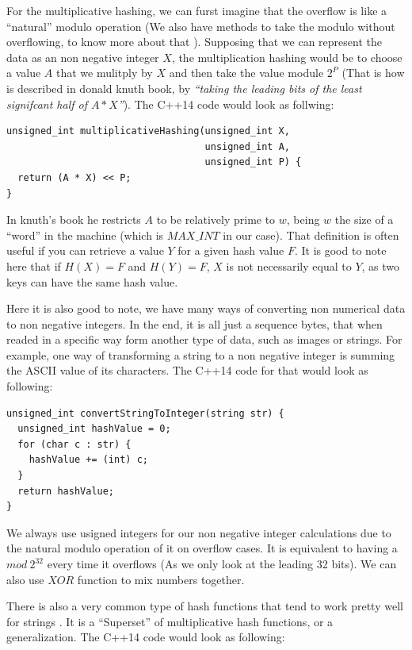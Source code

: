 For the multiplicative hashing, we can furst imagine that the overflow is like a ``natural'' modulo operation (We also have methods to take the modulo without overflowing, to know more about that ). Supposing that we can represent the data as an non negative integer \( X \), the multiplication hashing would be to choose a value \( A \) that we mulitply by \( X \) and then take the value module \( 2^P \) (That is how is described in donald knuth book, by \textit{``taking the leading bits of the least signifcant half of \( A * X \)''}). The C++14 code would look as follwing:

\medskip

\begin{lstlisting}
unsigned_int multiplicativeHashing(unsigned_int X,
                                   unsigned_int A,
                                   unsigned_int P) {
  return (A * X) << P; 
}
\end{lstlisting}

In knuth's book he restricts \( A \) to be relatively prime to \( w \), being \( w \) the size of a ``word'' in the machine (which is \( MAX\_INT \) in our case). That definition is often useful if you can retrieve a value \( Y \) for a given hash value \( F \). It is good to note here that if \( H(X) = F \) and \( H(Y) = F \), \( X \) is not necessarily equal to \( Y \), as two keys can have the same hash value.

Here it is also good to note, we have many ways of converting non numerical data to non negative integers. In the end, it is all just a sequence bytes, that when readed in a specific way form another type of data, such as images or strings. For example, one way of transforming a string to a non negative integer is summing the ASCII value of its characters. The C++14 code for that would look as following:

\begin{lstlisting}
unsigned_int convertStringToInteger(string str) {
  unsigned_int hashValue = 0;
  for (char c : str) {
    hashValue += (int) c;
  }
  return hashValue;
}
\end{lstlisting}

We always use usigned integers for our non negative integer calculations due to the natural modulo operation of it on overflow cases. It is equivalent to having a \( mod \ 2^{32} \) every time it overflows (As we only look at the leading 32 bits). We can also use \( XOR \) function to mix numbers together. 

There is also a very common type of hash functions that tend to work pretty well for strings \cite{DragonHashFunc}. It is a ``Superset'' of multiplicative hash functions, or a generalization. The C++14 code would look as following:

